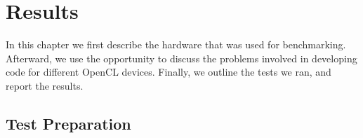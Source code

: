 
\chapter{Results} %

\label{Chapter6} %
In this chapter we first describe the hardware that was used for benchmarking. Afterward, we use the opportunity to discuss the problems involved in developing code for different OpenCL devices. Finally, we outline the tests we ran, and report the results.

\section{Test Preparation}

